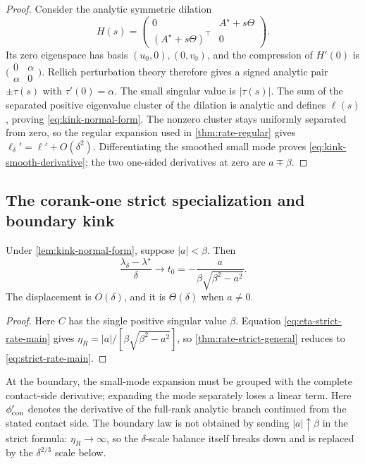 \begin{proof}
Consider the analytic symmetric dilation
\[
 H(s)=\begin{pmatrix}
 0&A^\star+s\Theta\\
 (A^\star+s\Theta)^\top&0
 \end{pmatrix}.
\]
Its zero eigenspace has basis \((u_0,0),(0,v_0)\), and the compression of
\(H'(0)\) is
\(\bigl(\begin{smallmatrix}0&\alpha\\\alpha&0\end{smallmatrix}\bigr)\).
Rellich perturbation theory \citep[Chapter II]{kato1995perturbation} therefore
gives a signed analytic pair \(\pm\tau(s)\) with
\(\tau'(0)=\alpha\).  The small singular value is \(|\tau(s)|\).  The sum of
the separated positive eigenvalue cluster of the dilation is analytic and
defines \(\ell(s)\), proving \eqref{eq:kink-normal-form}.  The nonzero cluster
stays uniformly separated from zero, so the regular expansion used in
\cref{thm:rate-regular} gives
\(\ell_\delta'=\ell'+O(\delta^2)\).  Differentiating the smoothed small mode
proves \eqref{eq:kink-smooth-derivative}; the two one-sided derivatives at
zero are \(a\mp\beta\).
\end{proof}

\subsection{The corank-one strict specialization and boundary kink}

\begin{corollary}
\label{thm:rate-strict}
Under \cref{lem:kink-normal-form}, suppose \(|a|<\beta\).  Then
\begin{equation}
 \frac{\lambda_\delta-\lambda^\star}{\delta}
 \longrightarrow
 t_0=-\frac{a}{\beta\sqrt{\beta^2-a^2}}.
 \label{eq:strict-rate-main}
\end{equation}
The displacement is \(O(\delta)\), and it is \(\Theta(\delta)\) when
\(a\ne0\).
\end{corollary}

\begin{proof}
Here \(C\) has the single positive singular value \(\beta\).
Equation \eqref{eq:eta-strict-rate-main} gives
\(\eta_R=|a|/[\beta\sqrt{\beta^2-a^2}]\), so
\cref{thm:rate-strict-general} reduces to \eqref{eq:strict-rate-main}.
\end{proof}

At the boundary, the small-mode expansion must be grouped with the complete
contact-side derivative; expanding the mode separately loses a linear term.
Here \(\phi'_{\rm con}\) denotes the derivative of the full-rank analytic branch
continued from the stated contact side.
The boundary law is not obtained by sending \(|a|\uparrow\beta\) in the
strict formula: \(\eta_R\to\infty\), so the \(\delta\)-scale balance itself
breaks down and is replaced by the \(\delta^{2/3}\) scale below.

